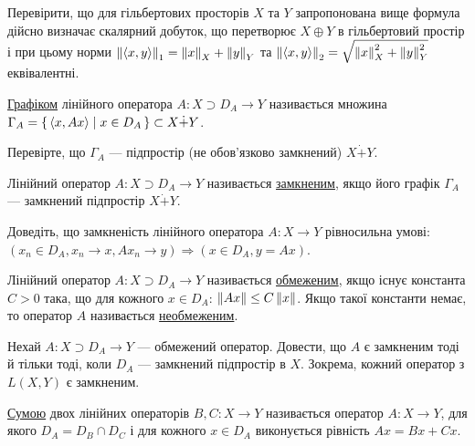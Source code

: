 \begin{exercise}
    Перевірити, що для гільбертових просторів $X$ та $Y$ запропонована вище формула дійсно визначає скалярний добуток,
    що перетворює $X \oplus Y$ в гільбертовий простір і при цьому норми $\left\lVert\left\langle x, y\right\rangle\right\rVert_1 = \left\lVert x\right\rVert_X + \left\lVert y\right\rVert_Y$ та
    $\left\lVert\left\langle x, y\right\rangle\right\rVert_2 = \sqrt{\left\lVert x\right\rVert_X^2 + \left\lVert y\right\rVert_Y^2}$ еквівалентні.
\end{exercise}

\begin{theory}
    \ul{Графіком} лінійного оператора $A : X \supset D_A \to Y$ називається множина
    $\Gamma_A = \set{\left\langle x, Ax\right\rangle \mid x \in D_A} \subset X \dot{+} Y$.
\end{theory}

\begin{exercise}
    Перевірте, що $\Gamma_A$ --- підпростір (не обов'язково замкнений) $X \dot{+} Y$.
\end{exercise}

\begin{theory}
    Лінійний оператор $A : X \supset D_A \to Y$ називається \ul{замкненим},
    якщо його графік $\Gamma_A$ --- замкнений підпростір $X \dot{+} Y$.
\end{theory}

\begin{exercise}
    Доведіть, що замкненість лінійного оператора $A : X \to Y$ рівносильна умові:
    $(x_n \in D_A, x_n \to x, A x_n \to y) \Rightarrow (x \in D_A, y = Ax)$.
\end{exercise}

\begin{theory}
    Лінійний оператор $A : X \supset D_A \to Y$ називається \ul{обмеженим}, якщо
    існує константа $C > 0$ така, що для кожного $x \in D_A$: $\left\lVert Ax\right\rVert \leq C \left\lVert x\right\rVert$.
    Якщо такої константи немає, то оператор $A$ називається \ul{необмеженим}.
\end{theory}

\begin{exercise}
    Нехай $A : X \supset D_A \to Y$ --- обмежений оператор. Довести, що $A$ є замкненим
    тоді й тільки тоді, коли $D_A$ --- замкнений підпростір в $X$. Зокрема, кожний оператор з $L(X,Y)$ є замкненим.
\end{exercise}

\begin{theory}
    \ul{Сумою} двох лінійних операторів $B, C : X \to Y$ називається оператор $A : X \to Y$,
    для якого $D_A = D_B \cap D_C$ і для кожного $x \in D_A$ виконується рівність $Ax = Bx + Cx$.
\end{theory}

